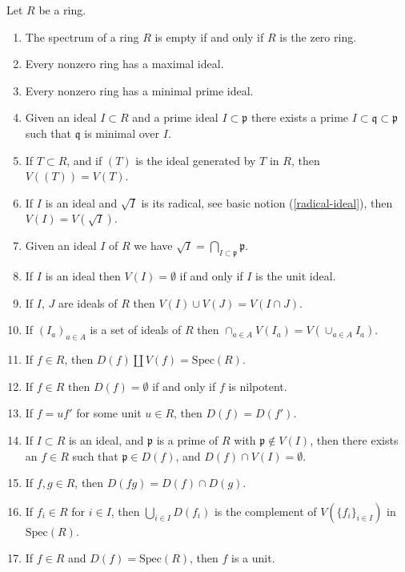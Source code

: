 \begin{lemma}
\label{lemma-Zariski-topology}
Let $R$ be a ring.
\begin{enumerate}
\item The spectrum of a ring $R$ is empty if and only if $R$
is the zero ring.
\item Every nonzero ring has a maximal ideal.
\item Every nonzero ring has a minimal prime ideal.
\item Given an ideal $I \subset R$ and a prime ideal
$I \subset \mathfrak p$ there exists a prime 
$I \subset \mathfrak q \subset \mathfrak p$ such
that $\mathfrak q$ is minimal over $I$.
\item If $T \subset R$, and if $(T)$ is the ideal generated by
$T$ in $R$, then $V((T)) = V(T)$.
\item If $I$ is an ideal and $\sqrt{I}$ is its radical,
see basic notion (\ref{radical-ideal}), then $V(I) = V(\sqrt{I})$.
\item Given an ideal $I$ of $R$ we have $\sqrt{I} =
\bigcap_{I \subset \mathfrak p} \mathfrak p$.
\item If $I$ is an ideal then $V(I) = \emptyset$ if and only
if $I$ is the unit ideal.
\item If $I$, $J$ are ideals of $R$ then $V(I) \cup V(J) =
V(I \cap J)$.
\item If $(I_a)_{a\in A}$ is a set of ideals of $R$ then
$\cap_{a\in A} V(I_a) = V(\cup_{a\in A} I_a)$.
\item If $f \in R$, then $D(f) \coprod V(f) = \text{Spec}(R)$.
\item If $f \in R$ then $D(f) = \emptyset$ if and only if $f$
is nilpotent.
\item If $f = u f'$ for some unit $u \in R$, then $D(f) = D(f')$.
\item If $I \subset R$ is an ideal, and $\mathfrak p$ is a prime of
$R$ with $\mathfrak p \not\in V(I)$, then there exists an $f \in R$
such that $\mathfrak p \in D(f)$, and $D(f) \cap V(I) = \emptyset$.
\item If $f,g \in R$, then $D(fg) = D(f) \cap D(g)$.
\item If $f_i \in R$ for $i \in I$, then
$\bigcup_{i\in I} D(f_i)$ is the complement of $V(\{f_i \}_{i\in I})$
in $\text{Spec}(R)$.
\item If $f \in R$ and $D(f) = \text{Spec}(R)$, then $f$ is a unit.
\end{enumerate}
\end{lemma}

